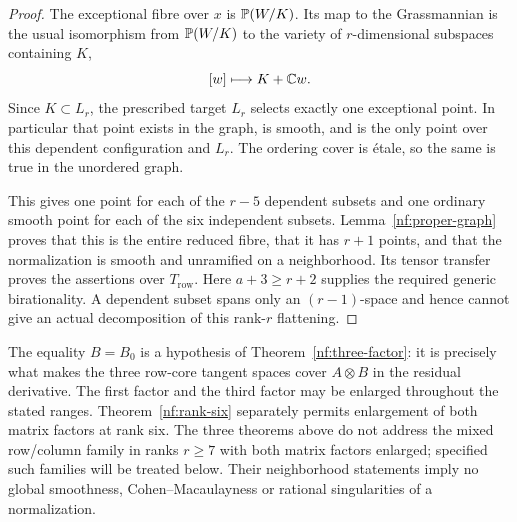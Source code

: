 \begin{proof}
The exceptional fibre over $x$ is $\mathbb P(W/K)$. Its map to the
Grassmannian is the usual isomorphism from $\mathbb P(W/K)$ to the
variety of $r$-dimensional subspaces containing $K$,
\[
 [w]\longmapsto K+\mathbb C w.
\]
Since $K\subset L_r$, the prescribed target $L_r$ selects exactly
one exceptional point. In particular that point exists in the graph,
is smooth, and is the only point over this dependent configuration
and $L_r$. The ordering cover is \'etale, so the same is true in the
unordered graph.

This gives one point for each of the $r-5$ dependent subsets and one
ordinary smooth point for each of the six independent subsets.
Lemma~\ref{nf:proper-graph} proves that this is the entire reduced
fibre, that it has $r+1$ points, and that the normalization is smooth
and unramified on a neighborhood. Its tensor transfer proves the
assertions over $T_{\mathrm{row}}$. Here $a+3\geq r+2$ supplies
the required generic birationality. A dependent subset spans only an
$(r-1)$-space and hence cannot give an actual decomposition of this
rank-$r$ flattening.
\end{proof}

The equality $B=B_0$ is a hypothesis of
Theorem~\ref{nf:three-factor}: it is precisely what makes the three
row-core tangent spaces cover $A\otimes B$ in the residual derivative.
The first factor and the third factor may be enlarged throughout the
stated ranges. Theorem~\ref{nf:rank-six} separately permits enlargement
of both matrix factors at rank six. The three theorems above do not address the mixed row/column family
in ranks $r\geq7$ with both matrix factors enlarged; specified such
families will be treated below. Their neighborhood statements imply
no global smoothness, Cohen--Macaulayness or rational singularities
of a normalization.
